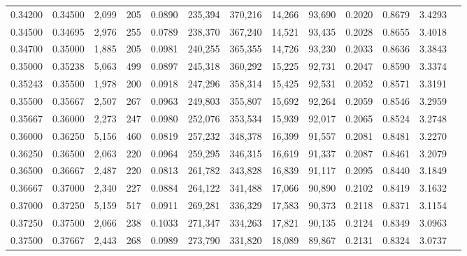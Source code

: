 \begin{tabular}{rrrrrrrrrrrrr}
0.34200 & 0.34500 & 2,099 & 205 &                                     0.0890 & 235,394 & 370,216 &  14,266 &  93,690 & 0.2020 & 0.8679 & 3.4293 \\
0.34500 & 0.34695 & 2,976 & 255 &                                     0.0789 & 238,370 & 367,240 &  14,521 &  93,435 & 0.2028 & 0.8655 & 3.4018 \\
0.34700 & 0.35000 & 1,885 & 205 &                                     0.0981 & 240,255 & 365,355 &  14,726 &  93,230 & 0.2033 & 0.8636 & 3.3843 \\
0.35000 & 0.35238 & 5,063 & 499 &                                     0.0897 & 245,318 & 360,292 &  15,225 &  92,731 & 0.2047 & 0.8590 & 3.3374 \\
0.35243 & 0.35500 & 1,978 & 200 &                                     0.0918 & 247,296 & 358,314 &  15,425 &  92,531 & 0.2052 & 0.8571 & 3.3191 \\
0.35500 & 0.35667 & 2,507 & 267 &                                     0.0963 & 249,803 & 355,807 &  15,692 &  92,264 & 0.2059 & 0.8546 & 3.2959 \\
0.35667 & 0.36000 & 2,273 & 247 &                                     0.0980 & 252,076 & 353,534 &  15,939 &  92,017 & 0.2065 & 0.8524 & 3.2748 \\
0.36000 & 0.36250 & 5,156 & 460 &                                     0.0819 & 257,232 & 348,378 &  16,399 &  91,557 & 0.2081 & 0.8481 & 3.2270 \\
0.36250 & 0.36500 & 2,063 & 220 &                                     0.0964 & 259,295 & 346,315 &  16,619 &  91,337 & 0.2087 & 0.8461 & 3.2079 \\
0.36500 & 0.36667 & 2,487 & 220 &                                     0.0813 & 261,782 & 343,828 &  16,839 &  91,117 & 0.2095 & 0.8440 & 3.1849 \\
0.36667 & 0.37000 & 2,340 & 227 &                                     0.0884 & 264,122 & 341,488 &  17,066 &  90,890 & 0.2102 & 0.8419 & 3.1632 \\
0.37000 & 0.37250 & 5,159 & 517 &                                     0.0911 & 269,281 & 336,329 &  17,583 &  90,373 & 0.2118 & 0.8371 & 3.1154 \\
0.37250 & 0.37500 & 2,066 & 238 &                                     0.1033 & 271,347 & 334,263 &  17,821 &  90,135 & 0.2124 & 0.8349 & 3.0963 \\
0.37500 & 0.37667 & 2,443 & 268 &                                     0.0989 & 273,790 & 331,820 &  18,089 &  89,867 & 0.2131 & 0.8324 & 3.0737 \\

\end{tabular}
